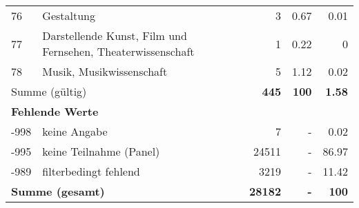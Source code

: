 \begin{longtable}{lXrrr}
        76 & \multicolumn{1}{X}{Gestaltung} & %
          \num{3} &
          \num[round-mode=places,round-precision=2]{0,67} &
          \num[round-mode=places,round-precision=2]{0,01} \\

        77 & \multicolumn{1}{X}{Darstellende Kunst, Film und Fernsehen, Theaterwissenschaft} & %
          \num{1} &
          \num[round-mode=places,round-precision=2]{0,22} &
          \num[round-mode=places,round-precision=2]{0} \\

        78 & \multicolumn{1}{X}{Musik, Musikwissenschaft} & %
          \num{5} &
          \num[round-mode=places,round-precision=2]{1,12} &
          \num[round-mode=places,round-precision=2]{0,02} \\

     \midrule
     \multicolumn{2}{l}{Summe (gültig)} &
       \textbf{\num{445}} &
     \textbf{100} &
       \textbf{\num[round-mode=places,round-precision=2]{1,58}} \\
     \multicolumn{5}{l}{\textbf{Fehlende Werte}}\\
       -998 &
       keine Angabe &
         \num{7} &
        - &
         \num[round-mode=places,round-precision=2]{0,02} \\
       -995 &
       keine Teilnahme (Panel) &
         \num{24511} &
        - &
         \num[round-mode=places,round-precision=2]{86,97} \\
       -989 &
       filterbedingt fehlend &
         \num{3219} &
        - &
         \num[round-mode=places,round-precision=2]{11,42} \\
     \midrule
     \multicolumn{2}{l}{\textbf{Summe (gesamt)}} &
          \textbf{\num{28182}} &
        \textbf{-} &
        \textbf{100} \\
     \bottomrule
     \end{longtable}
     
